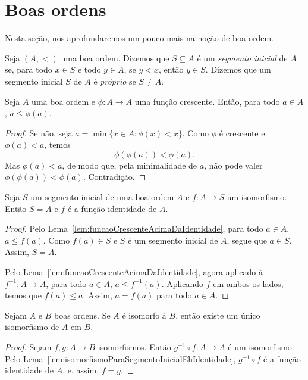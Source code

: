 \section{Boas ordens}\label{sec:boasOrdens}
Nesta seção, nos aprofundaremos um pouco mais na noção de boa ordem.

\begin{definition}[$\BST$]\label{def:segmentoInicial}
Seja $(A, <)$ uma boa ordem.
Dizemos que $S\subseteq A$ é um \emph{segmento inicial} de $A$ se, para todo $x\in S$ e todo $y\in A$, se $y<x$, então $y\in S$.
Dizemos que um segmento inicial $S$ de $A$ é \emph{próprio} se $S\neq A$.
\end{definition}

\begin{lemma}[$\BST$]\label{lem:funcaoCrescenteAcimaDaIdentidade}
    Seja $A$ uma boa ordem e $\phi: A\to A$ uma função crescente.
    Então, para todo $a\in A$, $a\leq \phi(a)$.
\end{lemma}
\begin{proof}
    Se não, seja $a=\min\{x\in A:\phi(x)<x\}$.
    Como $\phi$ é crescente e $\phi(a)<a$, temos
    \[
        \phi(\phi(a))<\phi(a).
    \]
    Mas $\phi(a)<a$, de modo que, pela minimalidade de $a$, não pode valer
    $\phi(\phi(a))<\phi(a)$.
    Contradição.
\end{proof}

\begin{lemma}[$\BST$]\label{lem:isomorfismoParaSegmentoInicialEhIdentidade}
    Seja $S$ um segmento inicial de uma boa ordem $A$ e $f:A\to S$ um isomorfismo.
    Então $S=A$ e $f$ é a função identidade de $A$.
\end{lemma}
\begin{proof}
    Pelo Lema~\ref{lem:funcaoCrescenteAcimaDaIdentidade}, para todo $a\in A$, $a\leq f(a)$.
    Como $f(a)\in S$ e $S$ é um segmento inicial de $A$, segue que $a\in S$.
    Assim, $S=A$.

    Pelo Lema~\ref{lem:funcaoCrescenteAcimaDaIdentidade}, agora aplicado à $f^{-1}: A\to A$, para todo $a\in A$, $a\leq f^{-1}(a)$.
    Aplicando $f$ em ambos os lados, temos que $f(a)\leq a$.
    Assim, $a=f(a)$ para todo $a\in A$.
\end{proof}

\begin{corollary}[$\BST$]\label{cor:unicidadeDoIsomorfismoDeBoasOrdens}
    Sejam $A$ e $B$ boas ordens.
    Se $A$ é isomorfo à $B$, então existe um único isomorfismo de $A$ em $B$.
\end{corollary}
\begin{proof}
    Sejam $f, g: A\to B$ isomorfismos.
    Então $g^{-1}\circ f: A\to A$ é um isomorfismo.
    Pelo Lema~\ref{lem:isomorfismoParaSegmentoInicialEhIdentidade}, $g^{-1}\circ f$ é a função identidade de $A$, e, assim, $f=g$.
\end{proof}

